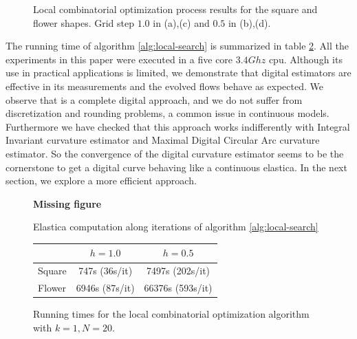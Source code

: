 \documentclass[runningheads]{llncs}
\begin{document}
\begin{figure}[!ht]
{	}%
	\hspace{10pt}
	\hspace{10pt}
		\caption{Local combinatorial optimization process results for the square and flower shapes. Grid step $1.0$ in (a),(c) and $0.5$ in (b),(d).}	
		\label{fig:local-comb-square-results}
\end{figure}


The running time of algorithm \ref{alg:local-search} is summarized in
table \ref{tab:summary-local-comb-rtime}. All the experiments in this paper were executed in a five core $3.4Ghz$ cpu. Although its use in practical applications is limited, we
demonstrate that digital estimators are effective in its measurements
and the evolved flows behave as expected. We observe that is a
complete digital approach, and we do not suffer from discretization
and rounding problems, a common issue in continuous models.
Furthermore we have checked that this approach works
  indifferently with Integral Invariant curvature estimator and
  Maximal Digital Circular Arc curvature estimator. So the convergence
  of the digital curvature estimator seems to be the cornerstone to
  get a digital curve behaving like a continuous elastica.  In the
next section, we explore a more efficient approach.



\begin{figure}
\begin{minipage}[b]{0.5\textwidth}
\center
	\textbf{Missing figure}
\caption{Elastica computation along iterations of algorithm \ref{alg:local-search}}
\label{fig:plot-elastica-local-search}
\end{minipage}\hspace{40pt}%
\begin{minipage}[b]{0.45\textwidth}
\center
\captionsetup{type=table}
\begin{tabular}{|l|c|c|}
\hline
& $h=1.0$ & $h=0.5$\\
\hline
Square & 747s (36s/it) & 7497s (202s/it)\\
\hline
Flower & 6946s (87s/it)  & 66376s (593s/it)\\
\hline
\end{tabular}
\caption{Running times for the local combinatorial optimization algorithm with $k=1,N=20$.}
\label{tab:summary-local-comb-rtime}
\end{minipage}
\end{figure}
\end{document}
